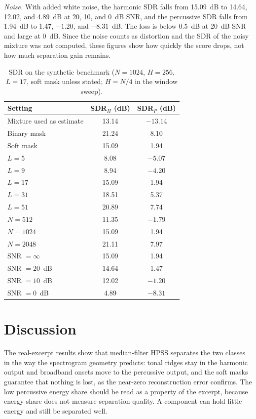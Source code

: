 \documentclass[conference]{IEEEtran}
\begin{document}
\emph{Noise.} With added white noise, the harmonic SDR falls from 15.09~dB to 14.64, 12.02, and 4.89~dB at 20, 10, and 0~dB SNR, and the percussive SDR falls from 1.94~dB to 1.47, $-1.20$, and $-8.31$~dB. The loss is below 0.5~dB at 20~dB SNR and large at 0~dB. Since the noise counts as distortion and the SDR of the noisy mixture was not computed, these figures show how quickly the score drops, not how much separation gain remains.

\begin{table}[t]
\centering
\caption{SDR on the synthetic benchmark ($N=1024$, $H=256$, $L=17$, soft mask unless stated; $H=N/4$ in the window sweep).}
\label{tab:sdr}
\footnotesize
\begin{tabular}{lcc}
\toprule
Setting & SDR$_H$ (dB) & SDR$_P$ (dB)\\
\midrule
Mixture used as estimate & 13.14 & $-13.14$\\
\midrule
Binary mask & 21.24 & 8.10\\
Soft mask & 15.09 & 1.94\\
\midrule
$L=5$ & 8.08 & $-5.07$\\
$L=9$ & 8.94 & $-4.20$\\
$L=17$ & 15.09 & 1.94\\
$L=31$ & 18.51 & 5.37\\
$L=51$ & 20.89 & 7.74\\
\midrule
$N=512$ & 11.35 & $-1.79$\\
$N=1024$ & 15.09 & 1.94\\
$N=2048$ & 21.11 & 7.97\\
\midrule
SNR $=\infty$ & 15.09 & 1.94\\
SNR $=20$~dB & 14.64 & 1.47\\
SNR $=10$~dB & 12.02 & $-1.20$\\
SNR $=0$~dB & 4.89 & $-8.31$\\
\bottomrule
\end{tabular}
\end{table}

\section{Discussion}
The real-excerpt results show that median-filter HPSS separates the two classes in the way the spectrogram geometry predicts: tonal ridges stay in the harmonic output and broadband onsets move to the percussive output, and the soft masks guarantee that nothing is lost, as the near-zero reconstruction error confirms. The low percussive energy share should be read as a property of the excerpt, because energy share does not measure separation quality. A component can hold little energy and still be separated well.
\end{document}
